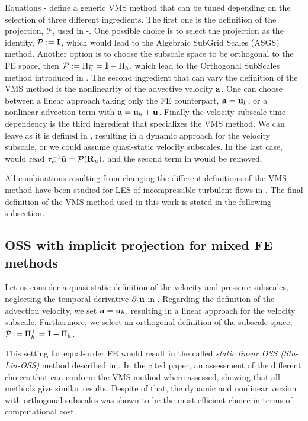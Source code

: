 Equations - define a generic VMS method that can be tuned depending on the selection of three different ingredients. The first one is the definition of the projection, $ \mathcal{P} $, used in -. One possible choice is to select the projection as the identity, $\mathcal{P}:=\mathbf{I}$, which would lead to the Algebraic SubGrid Scales (ASGS) method. Another option is to choose the subscale space to be orthogonal to the FE space, then $ \mathcal{P}:=\Pi^\perp_h=\mathbf{I}-\Pi_h $, which lead to the Orthogonal SubScales method introduced in \cite{codina_stabilization_2000}. The second ingredient that can vary the definition of the VMS method is the nonlinearity of the advective velocity $ {\bf a} $. One can choose between a linear approach taking only the FE counterpart, $ {\bf a}={\bf u}_h $, or a nonlinear advection term with $ {\bf a}={\bf u}_h+\tilde{{\bf u}} $. Finally the velocity subscale time-dependency is the third ingredient that specializes the VMS method. We can leave as it is defined in , resulting in a dynamic approach for the velocity subscale, or we could assume quasi-static velocity subscales. In the last case,  would read $ \tau_m^{-1}\tilde{{\bf u}}=\mathcal{P}({\bf R}_u)$, and the second term in  would be removed.

All combinations resulting from changing the different definitions of the VMS method have been studied for LES of incompressible turbulent flows in \cite{colomes_assessment_2015}. The final definition of the VMS method used in this work is stated in the following subsection.

\subsection{OSS with implicit projection for mixed FE methods}
\label{subsec-C7_OSS_mixed}
Let us consider a quasi-static definition of the velocity and pressure subscales, neglecting the temporal derivative $ \partial_t\tilde{{\bf u}} $ in . Regarding the definition of the advection velocity, we set $ {\bf a}={\bf u}_h $, resulting in a linear approach for the velocity subscale. Furthermore, we select an orthogonal definition of the subscale space, $ \mathcal{P}:=\Pi_h^\perp=\mathbf{I}-\Pi_h $.

This setting for equal-order FE would result in the called \textit{static linear OSS (Sta-Lin-OSS)} method described in \cite{colomes_assessment_2015}. In the cited paper, an assessment of the different choices that can conform the VMS method where assessed, showing that all methods give similar results.  Despite of that, the dynamic and nonlinear version with orthogonal subscales was shown to be the most efficient choice in terms of computational cost.

